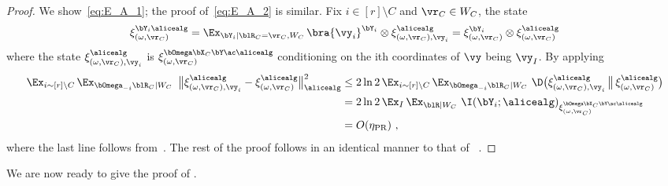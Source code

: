 \begin{proof}
	We show~\eqref{eq:E_A_1}; the proof of~\eqref{eq:E_A_2} is similar. Fix $i \in [r] \setminus C$ and $\vr_C \in W_C$, the state
	\[
		\xi_{(\omega, \vr_C)}^{\bY_i \alicealg} = \Ex_{\bY_i | \blR_C= \vr_C, W_C} \, \bra{\vy_i}^{\bY_i} \otimes \xi_{(\omega, \vr_C), \vy_i}^\alicealg = \xi_{(\omega, \vr_C)}^{\bY_i} \otimes 	\xi_{(\omega, \vr_C)}^{\alicealg}
	\]
	where the state $\xi_{(\omega, \vr_C), \vy_i}^\alicealg$ is $\xi^{\bOmega \bX_C \bY \ac \alicealg}_{(\omega, \vr_C)}$ conditioning on the ith coordinates of $\vy$ being $\vy_I$. By applying~
	\begin{align}
		\Ex_{i \sim [r] \setminus C} \, \Ex_{\bOmega_{-i} \blR_C |  W_C} \, \, \, \big \| \xi_{(\omega, \vr_C), \vy_i}^\alicealg -  \xi_{(\omega, \vr_C)}^\alicealg \big \|_\alicealg^2 &\leq 2  \ln 2 \, \Ex_{i \sim [r] \setminus C} \, \Ex_{\bOmega_{-i} \blR_C |  W_C}  \,\,  \D \big(   \xi_{(\omega, \vr_C), \vy_i}^\alicealg  \, \big \|\,  \xi_{(\omega, \vr_C)}^\alicealg \big )\notag\\
		&= 2\ln 2\, \Ex_I \, \Ex_{\blR | W_C} \,\,  \I (\bY_i ; \alicealg)_{\xi^{\bOmega \bX_C \bY \ac \alicealg}_{(\omega, \vr_C)}} \notag\\
		& = O(\eta_{\text{PR}})~,\label{eq:claim24-1a}
	\end{align} 
	where the last line follows from~. The rest of the proof follows in an identical manner to that of~\cite[Claim 5.14]{bavarianAnchoredParallelRepetition2021} .
	
\end{proof}

We are now ready to give the proof of .

